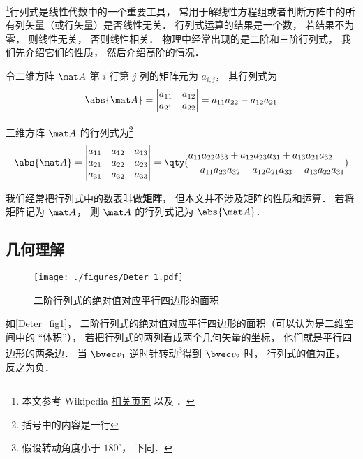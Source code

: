

\footnote{本文参考 Wikipedia \href{https://en.wikipedia.org/wiki/Determinant}{相关页面} 以及 \cite{同济线}．}行列式是线性代数中的一个重要工具， 常用于解线性方程组或者判断方阵中的所有列矢量（或行矢量）是否线性无关． %
行列式运算的结果是一个数， 若结果不为零， 则线性无关， 否则线性相关． 物理中经常出现的是二阶和三阶行列式， 我们先介绍它们的性质， 然后介绍高阶的情况．

令二维方阵 $\mat A$ 第 $i$ 行第 $j$ 列的矩阵元为 $a_{i,j}$， 其行列式为
\begin{equation}\label{Deter_eq1}
\abs{\mat A} =
\begin{vmatrix}
a_{11} & a_{12} \\
a_{21} & a_{22}
\end{vmatrix} = a_{11}a_{22} - a_{12}a_{21}
\end{equation}

三维方阵 $\mat A$ 的行列式为\footnote{括号中的内容是一行}
\begin{equation}\label{Deter_eq2}
\abs{\mat A} = 
\begin{vmatrix}
a_{11} & a_{12} & a_{13} \\
a_{21} & a_{22} & a_{23} \\
a_{31} & a_{32} & a_{33}
\end{vmatrix}
=
\qty(
\begin{aligned}
&a_{11}a_{22}a_{33} + a_{12}a_{23}a_{31} + a_{13}a_{21}a_{32} \\
&- a_{11}a_{23}a_{32} - a_{12}a_{21}a_{33} - a_{13}a_{22}a_{31}
\end{aligned}
)
\end{equation}

我们经常把行列式中的数表叫做\textbf{矩阵}， 但本文并不涉及矩阵的性质和运算． 若将矩阵记为 $\mat A$， 则 $\mat A$ 的行列式记为 $\abs{\mat A}$．

\subsection{几何理解}

\begin{figure}[ht]
\centering
\texttt{[image: ./figures/Deter\_1.pdf]}
\caption{二阶行列式的绝对值对应平行四边形的面积} \label{Deter_fig1}
\end{figure}
如\autoref{Deter_fig1}， 二阶行列式的绝对值对应平行四边形的面积（可以认为是二维空间中的 “体积”）， 若把行列式的两列看成两个几何矢量的坐标， 他们就是平行四边形的两条边． 当 $\bvec v_1$ 逆时针转动\footnote{假设转动角度小于 $180^\circ$， 下同．}得到 $\bvec v_2$ 时， 行列式的值为正， 反之为负．

